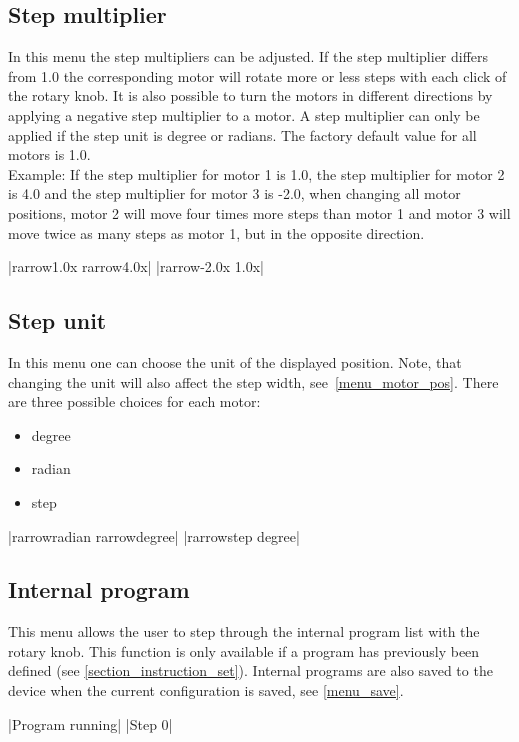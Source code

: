 \subsection{Step multiplier}
In this menu the step multipliers can be adjusted. If the step multiplier differs from 1.0 the corresponding motor will rotate more or less steps with each click of the rotary knob. It is also possible to turn the motors in different directions by applying a negative step multiplier to a motor. A step multiplier can only be applied if the step unit is degree or radians. The factory default value for all motors is 1.0.\\
Example: If the step multiplier for motor 1 is 1.0, the step multiplier for motor 2 is 4.0 and the step multiplier for motor 3 is -2.0, when changing all motor positions, motor 2 will move four times more steps than motor 1 and motor 3 will move twice as many steps as motor 1, but in the opposite direction. 
\begin{center}
  |{rarrow}1.0x   {rarrow}4.0x|
             |{rarrow}-2.0x   1.0x|
\end{center}

\subsection{Step unit}
\label{chp:change_step_unit}
In this menu one can choose the unit of the displayed position. Note, that changing the unit will also affect the step width, see~\ref{menu_motor_pos}. There are three possible choices for each motor:
\begin{itemize}
\item degree
\item radian
\item step
\end{itemize}
\begin{center}
  |{rarrow}radian {rarrow}degree|
             |{rarrow}step    degree|
\end{center}

\subsection{Internal program}
This menu allows the user to step through the internal program list with the rotary knob.
This function is only available if a program has previously been defined (see \ref{section_instruction_set}).
Internal programs are also saved to the device when the current configuration is saved, see \ref{menu_save}.
\begin{center}
  |Program running|
             |Step 0|
\end{center}

